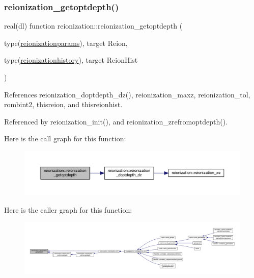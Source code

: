 \subsubsection{\texorpdfstring{reionization\+\_\+getoptdepth()}{reionization\_getoptdepth()}}
{\footnotesize\ttfamily real(dl) function reionization\+::reionization\+\_\+getoptdepth (\begin{DoxyParamCaption}\item[{type(\mbox{\hyperlink{structreionization_1_1reionizationparams}{reionizationparams}}), target}]{Reion,  }\item[{type(\mbox{\hyperlink{structreionization_1_1reionizationhistory}{reionizationhistory}}), target}]{Reion\+Hist }\end{DoxyParamCaption})}



References reionization\+\_\+doptdepth\+\_\+dz(), reionization\+\_\+maxz, reionization\+\_\+tol, rombint2, thisreion, and thisreionhist.



Referenced by reionization\+\_\+init(), and reionization\+\_\+zrefromoptdepth().

Here is the call graph for this function\+:
\nopagebreak
\begin{figure}[H]
\begin{center}
\leavevmode
\includegraphics[width=350pt]{namespacereionization_a8a3b0a917762ce13033f59ef52fad521_cgraph}
\end{center}
\end{figure}
Here is the caller graph for this function\+:
\nopagebreak
\begin{figure}[H]
\begin{center}
\leavevmode
\includegraphics[width=350pt]{namespacereionization_a8a3b0a917762ce13033f59ef52fad521_icgraph}
\end{center}
\end{figure}
\mbox{\label{namespacereionization_a59dc84ce6904020903bfc0ae6f864a27}} 
